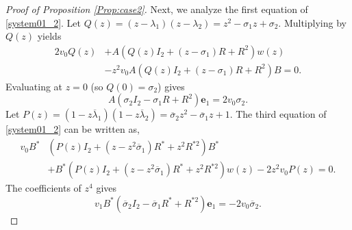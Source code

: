 \documentclass[12pt, reqno]{amsart}
\theoremstyle{definition}
\theoremstyle{remark}
\numberwithin{equation}{section}
\begin{document}
\begin{proof}[Proof of Proposition \ref{Prop:case2}]
	Next, we analyze the first equation of \eqref{system01_2}. Let $Q(z) = (z-\lambda_1)(z-\lambda_2) = z^2 - \sigma_1 z + \sigma_2$. Multiplying by $Q(z)$ yields
	\begin{align}\label{eq:1c2}
		2v_0 Q(z) &+ A \left( Q(z)I_2 + (z-\sigma_1) R + R^{2} \right) w(z) \nonumber \\
		& - z^2 v_0 A \left( Q(z)I_2 + (z-\sigma_1) R + R^{2} \right) B = 0.
	\end{align}
	Evaluating at $z=0$ (so $Q(0)=\sigma_2$) gives
	\begin{equation}\label{eq:c21z0}
		A \left( \sigma_2 I_2 - \sigma_1 R + R^{2} \right) \mathbf{e}_1 = 2v_0 \sigma_2.
	\end{equation}
 Let $P(z) = (1-z\overline{\lambda}_1)(1-z\overline{\lambda}_2) = \overline{\sigma}_2 z^2 - \overline{\sigma}_1 z + 1$. The third equation of \eqref{system01_2} can be written as,
	\begin{align}\label{eq:3c2}
		v_0 B^* & \left( P(z)I_2 + (z-z^2\overline{\sigma}_1) R^* + z^2R^{*2} \right) B^* \nonumber \\
		& + B^* \left( P(z)I_2 + (z-z^2\overline{\sigma}_1) R^* + z^2R^{*2} \right) w(z)- 2z^2 v_0 P(z) = 0.
	\end{align}
The coefficients of $z^4$ gives
	\begin{equation}\label{eq:c21z4}
	v_1	B^* \left( \overline{\sigma}_2 I_2 - \overline{\sigma}_1 R^* + R^{*2} \right) \mathbf{e}_1 = -2v_0 \overline{\sigma}_2.
	\end{equation}


\end{proof}
\end{document}
